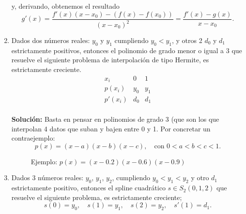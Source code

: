 \documentclass[12pt]{article}
\begin{document}
\begin{ejercicio}[4 puntos]
\begin{enumerate}[label=\alph*)]
				y, derivando, obtenemos el resultado
				$$g'(x) = \frac{f'(x)(x - x_0) - (f(x) - f(x_0))}{(x - x_0)^2} = \frac{f'(x) - g(x)}{x - x_0}.$$
				
			\item Dados dos números reales: $y_0$ y  $y_1$ cumpliendo $y_0 < y_1$, y otros 2 $d_0$ y $d_1$ estrictamente positivos, entonces el polinomio de grado menor o igual a 3 que resuelve el siguiente problema de interpolación de tipo Hermite, es estrictamente creciente.
			$$ \begin{array}{c|c|c}
				x_i & 0 & 1 \\
				\hline
				p(x_i) & y_0 & y_1 \\
				\hline
				p'(x_i) & d_0 & d_1 \\
			\end{array} $$
			
				\textbf{Solución:}  Basta en pensar en polinomios de grado 3 (que son los que interpolan 4 datos que suban y bajen entre 0 y 1. Por concretar un contraejemplo: 
				$$ p(x) = (x - a)(x - b)(x - c), \quad \text{con } 0 < a < b < c < 1. $$
				
				\begin{figure}[H]
					\centering 
					\caption{Ejemplo: $p(x)=(x-0.2)(x-0.6)(x-0.9)$}
				\end{figure}
				
			\item Dados 3 números reales: $y_0$, $y_1$, $y_2$, cumpliendo $y_0 < y_1 < y_2$ y otro $d_1$ estrictamente positivo, entonces el spline cuadrático $s \in S_2(0,1,2)$ que resuelve el siguiente problema, es estrictamente creciente;
			$$ s(0) = y_0, \quad s(1) = y_1, \quad s(2) = y_2, \quad s'(1) = d_1.$$
			

\end{enumerate}
\end{ejercicio}
\end{document}
